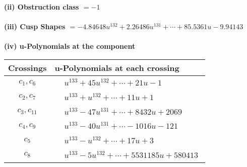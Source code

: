 \documentclass[1p]{elsarticle_modified}
\theoremstyle{definition}
\begin{document}
\flushleft \textbf{(ii) Obstruction class $= -1$}\\~\\
\flushleft \textbf{(iii) Cusp Shapes $= -4.84648 u^{132}+2.26486 u^{131}+\cdots+85.5361 u-9.94143$}\\~\\
\newpage\renewcommand{\arraystretch}{1}
\flushleft \textbf{(iv) u-Polynomials at the component}\newline \\
\begin{tabular}{m{50pt}|m{274pt}}
Crossings & \hspace{64pt}u-Polynomials at each crossing \\
\hline $$\begin{aligned}c_{1},c_{6}\end{aligned}$$&$\begin{aligned}
&u^{133}+45 u^{132}+\cdots+21 u-1
\end{aligned}$\\
\hline $$\begin{aligned}c_{2},c_{7}\end{aligned}$$&$\begin{aligned}
&u^{133}+u^{132}+\cdots+11 u+1
\end{aligned}$\\
\hline $$\begin{aligned}c_{3},c_{11}\end{aligned}$$&$\begin{aligned}
&u^{133}-47 u^{131}+\cdots+8432 u+2069
\end{aligned}$\\
\hline $$\begin{aligned}c_{4},c_{9}\end{aligned}$$&$\begin{aligned}
&u^{133}-40 u^{131}+\cdots-1016 u-121
\end{aligned}$\\
\hline $$\begin{aligned}c_{5}\end{aligned}$$&$\begin{aligned}
&u^{133}- u^{132}+\cdots+17 u+3
\end{aligned}$\\
\hline $$\begin{aligned}c_{8}\end{aligned}$$&$\begin{aligned}
&u^{133}-5 u^{132}+\cdots+5531185 u+580413
\end{aligned}$\\

\end{tabular}
\end{document}
